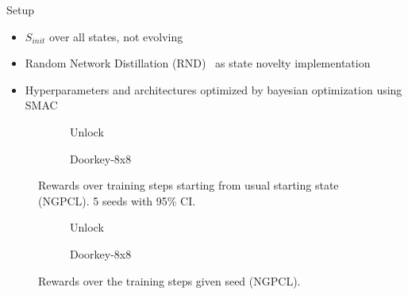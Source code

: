 \documentclass[aspectratio=169]{beamer}
\begin{document}
\begin{frame}{Setup}
  \begin{itemize}
    \item $S_{init}$ over all states, not evolving
    \item Random Network Distillation (RND)~\cite{rnd} as state novelty implementation
    \item Hyperparameters and architectures optimized by bayesian optimization using SMAC~\cite{smac}
  \end{itemize}
\end{frame}

\begin{frame}
  \begin{figure}
    \begin{subfigure}{0.48\textwidth}
      \centering
      
      \caption{Unlock}
    \end{subfigure}
    \begin{subfigure}{0.48\textwidth}
      \centering
      
      \caption{Doorkey-8x8}
    \end{subfigure}
    \caption{Rewards over training steps starting from usual starting state (NGPCL). 5 seeds with 95\% CI.}
  \end{figure}
\end{frame}

\begin{frame}
  \begin{figure}
    \begin{subfigure}{0.48\textwidth}
      \centering
      
      \caption{Unlock}
    \end{subfigure}
    \begin{subfigure}{0.48\textwidth}
      \centering
      
      \caption{Doorkey-8x8}
    \end{subfigure}
    \caption{Rewards over the training steps given seed (NGPCL).}
  \end{figure}
\end{frame}
\end{document}

